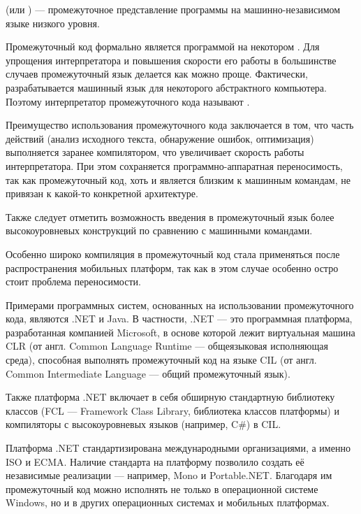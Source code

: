 \begin{defn}
   (или
  ) — промежуточное представление программы
  на машинно-независимом языке низкого уровня.
\end{defn}

Промежуточный код формально является программой на некотором
. Для упрощения
интерпретатора и повышения скорости его работы в большинстве случаев
промежуточный язык делается как можно проще.  Фактически,
разрабатывается машинный язык для некоторого абстрактного
компьютера. Поэтому интерпретатор промежуточного кода называют
.

Преимущество использования промежуточного кода заключается в том, что
часть действий (анализ исходного текста, обнаружение ошибок,
оптимизация) выполняется заранее компилятором, что увеличивает
скорость работы интерпретатора. При этом сохраняется
программно-аппаратная переносимость, так как промежуточный код, хоть и
является близким к машинным командам, не привязан к какой-то
конкретной архитектуре.

Также следует отметить возможность введения в промежуточный язык более
высокоуровневых конструкций по сравнению с машинными командами.

Особенно широко компиляция в промежуточный код стала применяться после
распространения мобильных платформ, так как в этом случае особенно
остро стоит проблема переносимости.

Примерами программных систем, основанных на использовании
промежуточного кода, являются .NET и Java. В частности, .NET — это
программная платформа, разработанная компанией Microsoft, в основе
которой лежит виртуальная машина CLR (от англ. Common Language Runtime
— общеязыковая исполняющая среда), способная выполнять промежуточный
код на языке CIL (от англ. Common Intermediate Language — общий
промежуточный язык).

Также платформа .NET включает в себя обширную стандартную библиотеку
классов (FCL — Framework Class Library, библиотека классов платформы)
и компиляторы с высокоуровневых языков (например, C\#) в CIL.

Платформа .NET стандартизирована международными организациями, а
именно ISO и ECMA. Наличие стандарта на платформу позволило создать её
независимые реализации — например, Mono и Portable.NET. Благодаря им
промежуточный код можно исполнять не только в операционной системе
Windows, но и в других операционных системах и мобильных платформах.

